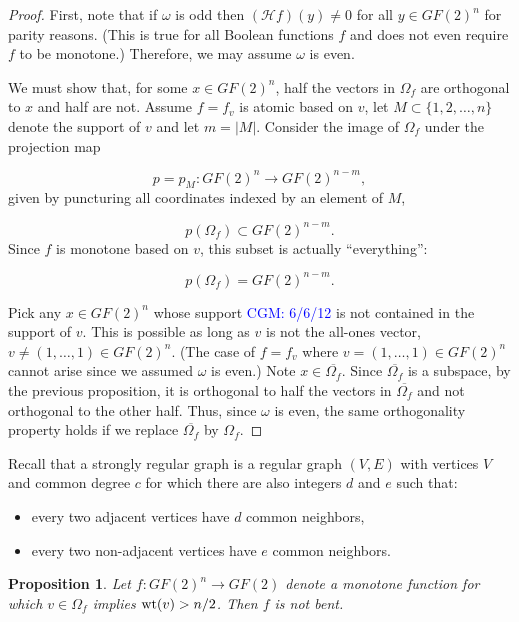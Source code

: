 \documentclass[12pt]{article}
\def\blue#1{\textcolor{blue}{#1}}
\newcommand{\cgm}[1]{\blue{CGM: #1}}
\newtheorem{proposition}[theorem]{Proposition}
\begin{document}
\begin{proof}
First, note that if $\omega$ is odd then
$({\mathcal{H}}f) (y)\not= 0$ for all $y\in GF(2)^n$ for parity
reasons.
(This is true for all Boolean functions $f$ and does not even require
$f$ to be monotone.)
Therefore, we may assume $\omega$ is even.

We must show that, for some $x\in GF(2)^n$, half the vectors in
$\Omega_f$ are orthogonal to $x$ and half are not.
Assume $f = f_v$ is atomic based on $v$,
let $M\subset \{1,2,\dots, n\}$ denote the support of
$v$ and let $m=|M|$.
Consider the image of $\Omega_f$ under the
projection map

\[
p = p_M: GF(2)^n \to GF(2)^{n-m},
\]
given by puncturing all coordinates
indexed by an element of $M$,

\[
p(\Omega_f)\subset GF(2)^{n-m}.
\]
Since $f$ is monotone based on $v$, this subset is actually
``everything'':

\[
p(\Omega_f) = GF(2)^{n-m}.
\]

Pick any $x\in GF(2)^n$ whose support \cgm{6/6/12}
is not contained in the support of $v$.  
This is possible as long as $v$ is not the all-ones vector,
$v\not= (1,\dots, 1)\in GF(2)^n$.
(The case of $f=f_v$ where $v= (1,\dots, 1)\in GF(2)^n$
cannot arise since we assumed $\omega$ is even.)
Note $x\in \overline{\Omega_f}$. Since $\overline{\Omega_f}$
is a subspace, by the previous proposition, it is orthogonal
to half the vectors in $\overline{\Omega_f}$ and not orthogonal
to the other half. Thus, since $\omega$ is
even, the same orthogonality property
holds if we replace $\overline{\Omega_f}$ by
$\Omega_f$.
\end{proof}

Recall that a strongly regular graph is a
regular graph $(V,E)$ with vertices $V$ and common degree $c$
for which there are also integers $d$ and $e$ such that:
\begin{itemize}
\item
every two adjacent vertices have $d$ common neighbors,
\item
every two non-adjacent vertices have $e$ common neighbors.
\end{itemize}

\begin{proposition}
Let $f:GF(2)^n\to GF(2)$ denote a monotone function for which
$v\in \Omega_f$ implies ${\rm wt}(v)>n/2$.
Then $f$ is not bent.
\end{proposition}
\end{document}
